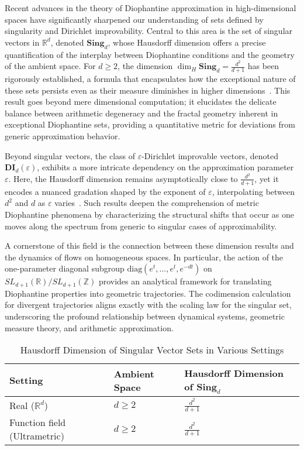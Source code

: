 \documentclass[sigconf]{acmart}
\begin{document}
Recent advances in the theory of Diophantine approximation in high-dimensional spaces have significantly sharpened our understanding of sets defined by singularity and Dirichlet improvability. Central to this area is the set of singular vectors in $\mathbb{R}^d$, denoted $\mathbf{Sing}_d$, whose Hausdorff dimension offers a precise quantification of the interplay between Diophantine conditions and the geometry of the ambient space. For $d \geq 2$, the dimension $\dim_H \mathbf{Sing}_d = \frac{d^2}{d+1}$ has been rigorously established, a formula that encapsulates how the exceptional nature of these sets persists even as their measure diminishes in higher dimensions~\cite{ref109}. This result goes beyond mere dimensional computation; it elucidates the delicate balance between arithmetic degeneracy and the fractal geometry inherent in exceptional Diophantine sets, providing a quantitative metric for deviations from generic approximation behavior.

Beyond singular vectors, the class of $\varepsilon$-Dirichlet improvable vectors, denoted $\mathbf{DI}_d(\varepsilon)$, exhibits a more intricate dependency on the approximation parameter $\varepsilon$. Here, the Hausdorff dimension remains asymptotically close to $\frac{d^2}{d+1}$, yet it encodes a nuanced gradation shaped by the exponent of $\varepsilon$, interpolating between $d^2$ and $d$ as $\varepsilon$ varies~\cite{ref109}. Such results deepen the comprehension of metric Diophantine phenomena by characterizing the structural shifts that occur as one moves along the spectrum from generic to singular cases of approximability.

A cornerstone of this field is the connection between these dimension results and the dynamics of flows on homogeneous spaces. In particular, the action of the one-parameter diagonal subgroup $\mathrm{diag}(e^t, \ldots, e^t, e^{-dt})$ on $SL_{d+1}(\mathbb{R})/SL_{d+1}(\mathbb{Z})$ provides an analytical framework for translating Diophantine properties into geometric trajectories. The codimension calculation for divergent trajectories aligns exactly with the scaling law for the singular set, underscoring the profound relationship between dynamical systems, geometric measure theory, and arithmetic approximation.

\begin{table*}[htbp]
\centering
\caption{Hausdorff Dimension of Singular Vector Sets in Various Settings}
\label{tab:dimension_comparison}
\begin{adjustbox}{max width=\textwidth}
\begin{tabular}{lll}
\toprule
\textbf{Setting} & \textbf{Ambient Space} & \textbf{Hausdorff Dimension of $\mathbf{Sing}_d$} \\
\midrule
Real ($\mathbb{R}^d$) & $d \geq 2$ & $\frac{d^2}{d+1}$ \\
Function field (Ultrametric) & $d \geq 2$ & $\frac{d^2}{d+1}$ \\
\bottomrule
\end{tabular}
\end{adjustbox}
\end{table*}
\end{document}
